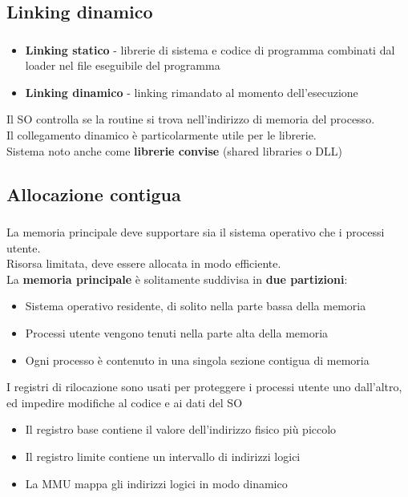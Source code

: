 \documentclass{beamer}
\newenvironment{mainframe}{
	\begin{frame}
		\frametitle{\insertsubsection}
		\framesubtitle{\insertsection}
	}{
	\end{frame}
}
\begin{document}
\subsection{Linking dinamico}
\begin{mainframe}
	\begin{itemize}
		\item \textbf{Linking statico} - librerie di sistema e codice di programma combinati dal loader nel file eseguibile del programma
		\item \textbf{Linking dinamico} - linking rimandato al momento dell'esecuzione
	\end{itemize}
	Il SO controlla se la routine si trova nell'indirizzo di memoria del processo.\\
	Il collegamento dinamico è particolarmente utile per le librerie.\\
	Sistema noto anche come \textbf{librerie convise} (shared libraries o DLL)
\end{mainframe}
\subsection{Allocazione contigua}
\begin{mainframe}
	La memoria principale deve supportare sia il sistema operativo che i processi utente.\\
	Risorsa limitata, deve essere allocata in modo efficiente.\\
	La \textbf{memoria principale} è solitamente suddivisa in \textbf{due partizioni}:
	\begin{itemize}
		\item Sistema operativo residente, di solito nella parte bassa della memoria
		\item Processi utente vengono tenuti nella parte alta della memoria
		\item Ogni processo è contenuto in una singola sezione contigua di memoria
	\end{itemize}
	I registri di rilocazione sono usati per proteggere i processi utente uno dall'altro, ed impedire modifiche al codice e ai dati del SO
	\begin{itemize}
		\item Il registro base contiene il valore dell'indirizzo fisico più piccolo
		\item Il registro limite contiene un intervallo di indirizzi logici
		\item La MMU mappa gli indirizzi logici in modo dinamico
	\end{itemize}
\end{mainframe}
\end{document}
